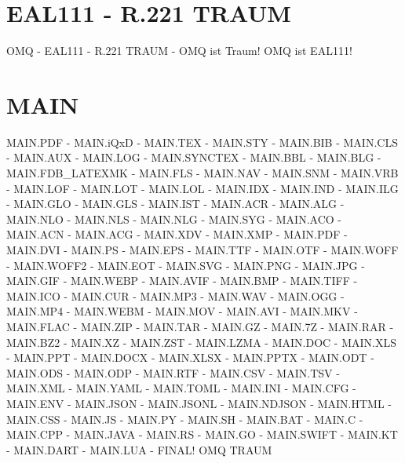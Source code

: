 \documentclass{MAIN}
\begin{document}
\maketitle
\section*{EAL111 - R.221 TRAUM}
OMQ - EAL111 - R.221 TRAUM - OMQ ist Traum! OMQ ist EAL111!
\section*{MAIN}
MAIN.PDF - MAIN.iQxD - MAIN.TEX - MAIN.STY - MAIN.BIB - MAIN.CLS - MAIN.AUX - MAIN.LOG - MAIN.SYNCTEX - MAIN.BBL - MAIN.BLG - MAIN.FDB_LATEXMK - MAIN.FLS - MAIN.NAV - MAIN.SNM - MAIN.VRB - MAIN.LOF - MAIN.LOT - MAIN.LOL - MAIN.IDX - MAIN.IND - MAIN.ILG - MAIN.GLO - MAIN.GLS - MAIN.IST - MAIN.ACR - MAIN.ALG - MAIN.NLO - MAIN.NLS - MAIN.NLG - MAIN.SYG - MAIN.ACO - MAIN.ACN - MAIN.ACG - MAIN.XDV - MAIN.XMP - MAIN.PDF - MAIN.DVI - MAIN.PS - MAIN.EPS - MAIN.TTF - MAIN.OTF - MAIN.WOFF - MAIN.WOFF2 - MAIN.EOT - MAIN.SVG - MAIN.PNG - MAIN.JPG - MAIN.GIF - MAIN.WEBP - MAIN.AVIF - MAIN.BMP - MAIN.TIFF - MAIN.ICO - MAIN.CUR - MAIN.MP3 - MAIN.WAV - MAIN.OGG - MAIN.MP4 - MAIN.WEBM - MAIN.MOV - MAIN.AVI - MAIN.MKV - MAIN.FLAC - MAIN.ZIP - MAIN.TAR - MAIN.GZ - MAIN.7Z - MAIN.RAR - MAIN.BZ2 - MAIN.XZ - MAIN.ZST - MAIN.LZMA - MAIN.DOC - MAIN.XLS - MAIN.PPT - MAIN.DOCX - MAIN.XLSX - MAIN.PPTX - MAIN.ODT - MAIN.ODS - MAIN.ODP - MAIN.RTF - MAIN.CSV - MAIN.TSV - MAIN.XML - MAIN.YAML - MAIN.TOML - MAIN.INI - MAIN.CFG - MAIN.ENV - MAIN.JSON - MAIN.JSONL - MAIN.NDJSON - MAIN.HTML - MAIN.CSS - MAIN.JS - MAIN.PY - MAIN.SH - MAIN.BAT - MAIN.C - MAIN.CPP - MAIN.JAVA - MAIN.RS - MAIN.GO - MAIN.SWIFT - MAIN.KT - MAIN.DART - MAIN.LUA - FINAL!
\cite{omq_eal111}
\ac{OMQ}
\ac{TRAUM}

\printindex
\printglossary
\printnomenclature
\printacronyms
\end{document}

